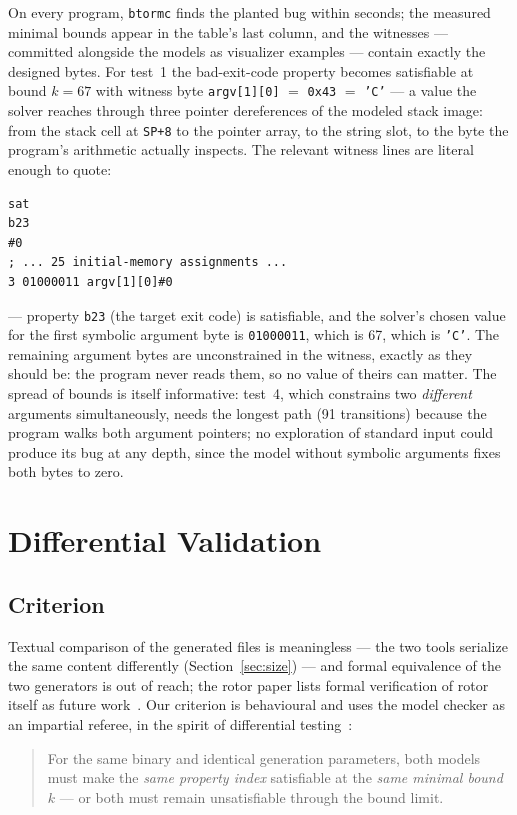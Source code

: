 \documentclass[sigplan,screen,nonacm]{acmart}
\begin{document}
On every program, \texttt{btormc} finds the planted bug within seconds;
the measured minimal bounds appear in the table's last column, and the
witnesses --- committed alongside the models as visualizer examples ---
contain exactly the designed bytes. For test~1 the bad-exit-code
property becomes satisfiable at bound $k{=}67$ with witness byte
\texttt{argv[1][0]} $=$ \texttt{0x43} $=$ \texttt{'C'} --- a value the
solver reaches through three pointer dereferences of the modeled stack
image: from the stack cell at \texttt{SP{+}8} to the pointer array, to
the string slot, to the byte the program's arithmetic actually
inspects. The relevant witness lines are literal enough to quote:
\begin{lstlisting}
sat
b23
#0
; ... 25 initial-memory assignments ...
3 01000011 argv[1][0]#0
\end{lstlisting}
\noindent --- property \texttt{b23} (the target exit code) is
satisfiable, and the solver's chosen value for the first symbolic
argument byte is \texttt{01000011}, which is 67, which is \texttt{'C'}.
The remaining argument bytes are unconstrained in the witness, exactly
as they should be: the program never reads them, so no value of theirs
can matter. The spread of bounds is itself informative: test~4, which
constrains two \emph{different} arguments simultaneously, needs the
longest path (91 transitions) because the program walks both argument
pointers; no exploration of standard input could produce its bug at any
depth, since the model without symbolic arguments fixes both bytes to
zero.

\section{Differential Validation}
\label{sec:validation}

\subsection{Criterion}

Textual comparison of the generated files is meaningless --- the two
tools serialize the same content differently
(Section~\ref{sec:size}) --- and formal equivalence of the two
generators is out of reach; the rotor paper lists formal verification
of rotor itself as future work~\cite{rotorpaper}. Our criterion is
behavioural and uses the model checker as an impartial referee, in the
spirit of differential testing~\cite{mckeeman}:

\begin{quote}
For the same binary and identical generation parameters, both models
must make the \emph{same property index} satisfiable at the \emph{same
minimal bound} $k$ --- or both must remain unsatisfiable through the
bound limit.
\end{quote}
\end{document}
